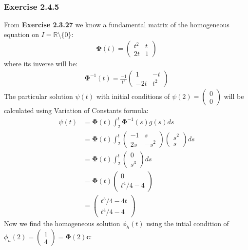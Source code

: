 \documentclass[12pt, letterpaper]{scrartcl}
\newcommand{\R}{\mathbb{R}}
\begin{document}
\subsubsection*{Exercise 2.4.5}
From \textbf{Exercise 2.3.27} we know a fundamental matrix of the homogeneous equation on $I=\R\setminus\{0\}$:
\begin{align*}
    \bm\Phi(t)=
    \left( \begin{array}{cc} t^2 & t \\ 2t & 1 \end{array}\right)
\end{align*}
where its inverse will be:
\begin{align*}
    \bm\Phi^{-1}(t)=\frac{-1}{t^2}
    \left( \begin{array}{cc} 1 & -t \\ -2t & t^2 \end{array}\right)
\end{align*}
The particular solution $\psi(t)$ with initial conditions of $\psi(2)=\left( \begin{array}{c} 0 \\ 0\end{array}\right)$ will be calculated using Variation of Constants formula:
\begin{align*}
    \psi(t)&=\bm\Phi(t)\int_2^t \bm\Phi^{-1}(s)g(s)ds\\
    &=\bm\Phi(t)\int_2^t \left( \begin{array}{cc} -1 & s \\ 2s & -s^2 \end{array}\right)\left( \begin{array}{c} s^2 \\ s\end{array}\right)ds\\
    &=\bm\Phi(t)\int_2^t \left( \begin{array}{c} 0 \\ s^3\end{array}\right)ds\\
    &=\bm\Phi(t)\left( \begin{array}{c} 0 \\ t^4/4-4\end{array}\right)\\
    &=\left( \begin{array}{c} t^5/4-4t \\ t^4/4-4\end{array}\right)
\end{align*}
Now we find the homogeneous solution $\phi_h(t)$ using the intial condition of $\phi_h(2)=\left( \begin{array}{c} 1 \\ 4\end{array}\right)=\bm\Phi(2)\bm c$:
\end{document}
